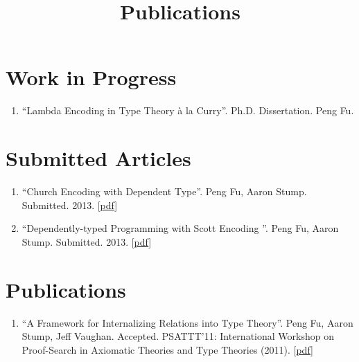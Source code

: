 \documentclass[10pt]{article}
\title{\bfseries\Large Publications}
\date{}
\begin{document}
\maketitle
\vspace{-4em}

\vspace{20pt}

\section*{Work in Progress}

\begin{enumerate}
\item ``Lambda Encoding in Type Theory \`a la Curry''. Ph.D. Dissertation. Peng Fu. 
\end{enumerate}

\section*{Submitted Articles}

\begin{enumerate}
\item ``Church Encoding with Dependent Type''. Peng Fu, Aaron Stump. Submitted. 2013. [\href{../../document/papers/esop-2013.pdf}{pdf}]
\item ``Dependently-typed Programming with Scott Encoding ''. Peng Fu, Aaron Stump. Submitted. 2013. [\href{../../document/papers/plpv-2013.pdf}{pdf}]

\end{enumerate}

\section*{Publications}

\begin{enumerate}
\item ``A Framework for Internalizing Relations into Type Theory''. Peng Fu, Aaron Stump, Jeff Vaughan. Accepted. PSATTT'11: International Workshop on Proof-Search in Axiomatic Theories and Type Theories (2011). [\href{../../document/papers/psattt-paper.pdf}{pdf}]
  
\end{enumerate}
\end{document}
